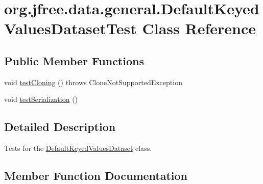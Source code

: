 \hypertarget{classorg_1_1jfree_1_1data_1_1general_1_1_default_keyed_values_dataset_test}{}\section{org.\+jfree.\+data.\+general.\+Default\+Keyed\+Values\+Dataset\+Test Class Reference}
\label{classorg_1_1jfree_1_1data_1_1general_1_1_default_keyed_values_dataset_test}
\subsection*{Public Member Functions}
\begin{DoxyCompactItemize}
\item 
void \mbox{\hyperlink{classorg_1_1jfree_1_1data_1_1general_1_1_default_keyed_values_dataset_test_ab662ef01724c51f0139f9be842075fa0}{test\+Cloning}} ()  throws Clone\+Not\+Supported\+Exception 
\item 
void \mbox{\hyperlink{classorg_1_1jfree_1_1data_1_1general_1_1_default_keyed_values_dataset_test_a024c2b875baa0156c27ee9dc7ee3ad5c}{test\+Serialization}} ()
\end{DoxyCompactItemize}


\subsection{Detailed Description}
Tests for the \mbox{\hyperlink{classorg_1_1jfree_1_1data_1_1general_1_1_default_keyed_values_dataset}{Default\+Keyed\+Values\+Dataset}} class. 

\subsection{Member Function Documentation}
\mbox{\label{classorg_1_1jfree_1_1data_1_1general_1_1_default_keyed_values_dataset_test_ab662ef01724c51f0139f9be842075fa0}} 
